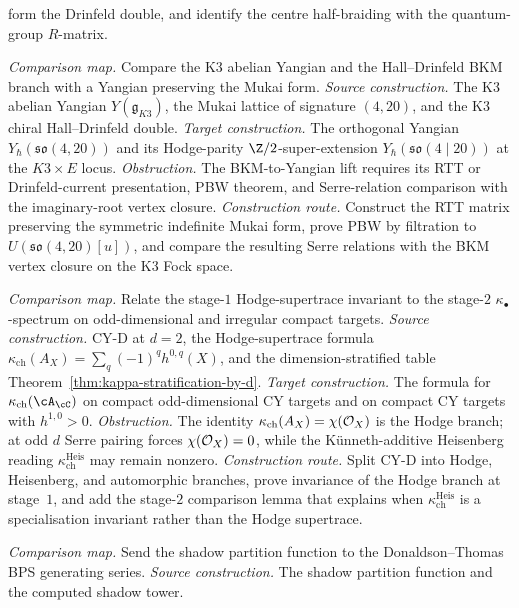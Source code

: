 \begin{description}[leftmargin=2.7em,style=nextline,topsep=0.3ex,itemsep=0.6ex]
 form the Drinfeld double, and identify the centre
 half-braiding with the quantum-group $R$-matrix.
 \item[\textbf{CM--OY. Orthogonal Mukai Yangian.}]
 \emph{Comparison map.}
 Compare the K3 abelian Yangian and the Hall--Drinfeld BKM
 branch with a Yangian preserving the Mukai form.
 \emph{Source construction.}
 The K3 abelian Yangian
 $Y(\mathfrak{g}_{K3})$, the Mukai lattice of signature
 $(4,20)$, and the K3 chiral Hall--Drinfeld double.
 \emph{Target construction.}
 The orthogonal Yangian
 $Y_\hbar(\mathfrak{so}(4,20))$ and its Hodge-parity
 $\Z/2$-super-extension
 $Y_\hbar(\mathfrak{so}(4\mid20))$ at the
 $K3\times E$ locus.
 \emph{Obstruction.}
 The BKM-to-Yangian lift requires its RTT or Drinfeld-current
 presentation, PBW theorem, and Serre-relation comparison
 with the imaginary-root vertex closure.
 \emph{Construction route.}
 Construct the RTT matrix preserving the symmetric
 indefinite Mukai form, prove PBW by filtration to
 $U(\mathfrak{so}(4,20)[u])$, and compare the resulting
 Serre relations with the BKM vertex closure on the K3 Fock
 space.
 \item[\textbf{CM--D. Odd-dimensional modular characteristic.}]
 \emph{Comparison map.}
 Relate the stage-$1$ Hodge-supertrace invariant to the
 stage-$2$ $\kappa_\bullet$-spectrum on odd-dimensional and
 irregular compact targets.
 \emph{Source construction.}
 CY-D at $d=2$, the Hodge-supertrace formula
 $\kappa_{\mathrm{ch}}(A_X)=\sum_q(-1)^q h^{0,q}(X)$, and
 the dimension-stratified table
 Theorem~\ref{thm:kappa-stratification-by-d}.
 \emph{Target construction.}
 The formula for $\kappa_{\mathrm{ch}}(\cA_\cC)$ on compact
 odd-dimensional CY targets and on compact CY targets with
 $h^{1,0}>0$.
 \emph{Obstruction.}
 The identity
 $\kappa_{\mathrm{ch}}(A_X)=\chi(\mathcal{O}_X)$ is the Hodge branch;
 at odd $d$ Serre pairing forces $\chi(\mathcal{O}_X)=0$, while the
 K\"unneth-additive Heisenberg reading
 $\kappa_{\mathrm{ch}}^{\mathrm{Heis}}$ may remain nonzero.
 \emph{Construction route.}
 Split CY-D into Hodge, Heisenberg, and automorphic branches,
 prove invariance of the Hodge branch at stage~$1$, and add
 the stage-$2$ comparison lemma that explains when
 $\kappa_{\mathrm{ch}}^{\mathrm{Heis}}$ is a specialisation
 invariant rather than the Hodge supertrace.
 \item[\textbf{CM--DT. Shadow to BPS/DT invariants.}]
 \emph{Comparison map.}
 Send the shadow partition function to the Donaldson--Thomas
 BPS generating series.
 \emph{Source construction.}
 The shadow partition function and the computed shadow tower.

\end{description}
